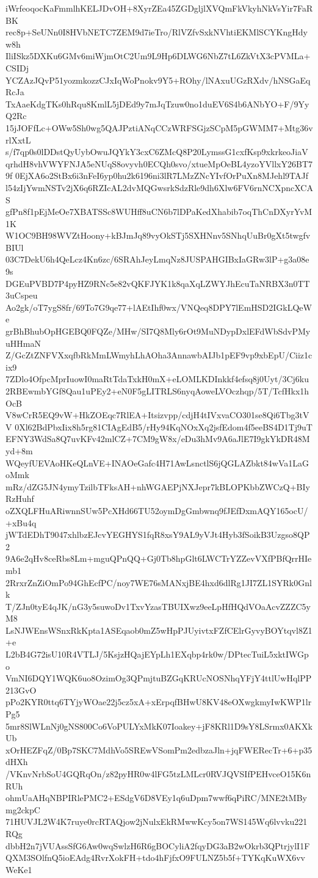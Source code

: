 iWrfeoqocKaFmmlhKELJDvOH+8XyrZEa45ZGDgljlXVQmFkVkyhNkVsYir7FaRBK
rec8p+SeUNn0I8HVbNETC7ZEM9d7ieTro/RlVZfvSxkNVhtiEKMlSCYKngHdyw8h
IliISkz5DXKu6GMv6miWjmOtC2Um9L9Hp6DLWG6NbZ7tL6ZkVtX3cPVMLa+CSIDj
YCZAzJQvP51yozmkozzCJxIqWoPnokv9Y5+ROhy/lNAxuUGzRXdv/hNSGaEqRcJa
TxAaeKdgTKs0hRqu8KmlL5jDEd9y7mJqTzuw0no1duEV6S4b6ANbYO+F/9YyQ2Rc
15jJOFfLc+OWw5Sh0wg5QAJPztiANqCCzWRFSGjzSCpM5pGWMM7+Mtg36vrlXxtL
s/f7qp0s0lDDstQyUybOwuJQYkY3cxC6ZMcQ8P20LymssG1cxfKsp9xkrkeoJiaV
qrhdH8vhVWYFNJA5eNUqS8ovyvh0ECQh0svo/xtueMpOeBL4yzoYVllxY26BT79f
0EjXA6o2StBx6i3nFeI6yp0hu2k6196ni3lR7LMzZNcYIvfOrPuXn8MJehl9TAJf
l54zIjYwmNSTv2jX6q6RZIcAL2dvMQGwsrkSdzRle9dh6Xlw6FV6rnNCXpncXCAS
gfPn8f1pEjMeOe7XBATSSc8WUHff8uCN6b7lDPaKedXhabib7oqThCnDXyrYvM1K
W1OC9BH98WVZtHoony+kBJmJq89vyOkSTj5SXHNnv5SNhqUuBr0gXt5twgfvBIUl
03C7DekU6h4QeLcz4Kn6zc/6SRAhJeyLmqNz8JUSPAHGIBxIaGRw3lP+g3a08e9s
DGEuPVBD7P4pyHZ9RNc5e82vQKFJYK1k8qaXqLZWYJhEcuTaNRBX3n0TT3uCspeu
Ao2gk/oT7ygS8fr/69To7G9qe77+lAEtIhf0wx/VNQeq8DPY7lEmHSD2IGkLQeWe
grBhBhubOpHGEBQ0FQZe/MHw/SI7Q8Mly6rOt9MuNDypDxlEFdWbSdvPMyuHHmaN
Z/GcZtZNFVXxqfbRkMmLWmyhLhAOha3AnnawbAIJb1pEF9vp9xbEpU/Ciiz1cix9
7ZDlo4OfpcMprIuowI0maRtTdaTxkH0mX+eLOMLKDInkkf4efsq8j0Uyt/3Cj6ku
2RBEwmbYGf8Qau1uPEy2+eN0F5gLITRLS6nyqAoweLVOczhqp/5T/TcfHkx1hOcB
V8wCrR5EQ9vW+HkZOEqc7RlEA+Itsizvpp/cdjH4tIVxvaCO301se8Qi6Tbg3tVV
0Xl62BdPbxIix8h5rg81CIAgEdB5/rHy94KqNOxXq2jsfEdom4f5eeBS4D1Tj9uT
EFNY3WdSa8Q7uvKFv42mlCZ+7CM9gW8x/eDu3hMv9A6aJlE7I9gkYkDR48Myd+8m
WQeyfUEVAoHKeQLnVE+INAOeGafc4H71AwLsnctlS6jQGLAZbkt84wVa1LaGoMmk
mRz/dZG5JN4ymyTzilbTFksAH+nhWGAEPjNXJepr7kBLOPKbbZWCzQ+BIyRzHuhf
oZXQLFHuARiwnnSUw5PcXHd66TU52oymDgGmbwnq9fJEfDxmAQY165ocU/+xBu4q
jWTdEDhT9047xhlbzEJcvYEGHYS1fqR8xsY9AL9yVJt4Hyb3fSoikB3Uzgso8QP2
9A6e2qHv8ceRbs8Lm+mguQPnQQ+Gj0Tb8hpGlt6LWCTrYZZevVXfPBfQrrHIemb1
2RrxrZnZiOmPo94GhEcfPC/noy7WE76sMANxjBE4hxd6dlRg1JI7ZL1SYRk0Gnlk
T/ZJn0tyE4qJK/nG3y5suwoDv1TxvYzasTBUIXwz9eeLpHfHQdVOaAcvZZZC5yM8
LsNJWEnsWSnxRkKpta1ASEqaob0mZ5wHpPJUyivtxFZfCElrGyvyBOYtqvl8Z1+e
L2bB4G72isU10R4VTLJ/5KsjzHQajEYpLh1EXqbp4rk0w/DPtecTuiL5xktIWGpo
VmNI6DQY1WQK6uo8OzimOg3QPmjtuBZGqKRUcNOSNhqYFjY4ttlUwHqlPP213GvO
pPo2KYR0ttq6TYjyWOae22j5cz5xA+xErpqfBHwU8KV48eOXwgkmyIwKWP1lrPg5
5mr8SlWLnNj0gNS800Co6VoPULYxMkK07Ioakey+jF8KRl1D9sY8LSrmx0AKXkUb
xOrHEZFqZ/0Bp7SKC7MdhVo5SREwVSomPm2edbzaJln+jqFWERecTr+6+p35dHXh
/VKnvNrbSoU4GQRqOn/z82pyHR0w4lFG5tzLMLcr0RVJQVSIfPEHvceO15K6nRUh
ohmUaAHqNBPIRlePMC2+ESdgV6D8VEy1q6uDpm7wwf6qPiRC/MNE2tMBymg2ckpC
71HUVJL2W4K7ruye0rcRTAQjow2jNulxEkRMwwKcy5on7WS145Wq6lvvku221RQg
dbbH2n7jVUAssSfG6Aw0wqSwlzH6R6gBOCyliA2fqyDG3aB2wOkrb3QPtrjylI1F
QXM3SOlfnQ5ioEAdg4RvrXokFH+tdo4hFjfxO9FULNZ5b5f+TYKqKuWX6vvWeKe1
